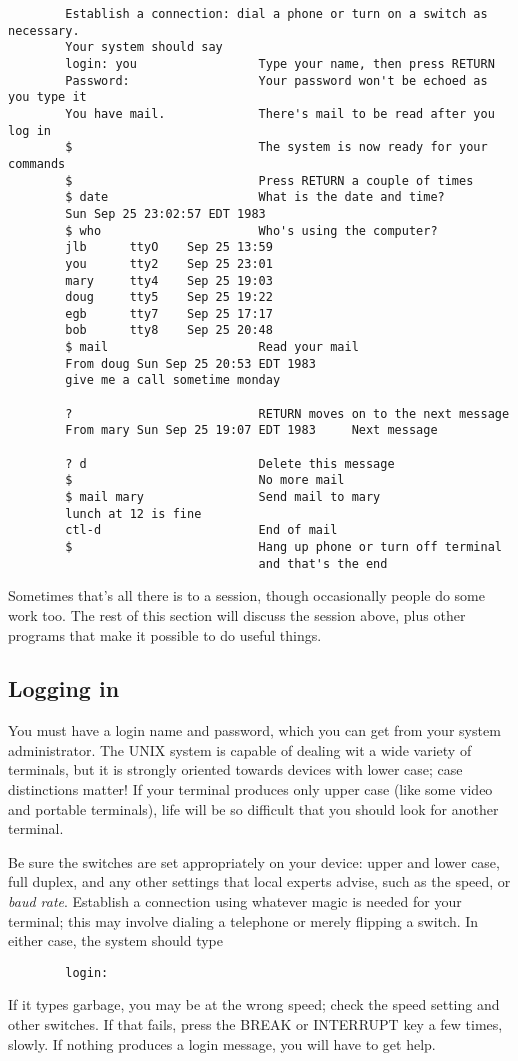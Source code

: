 \begin{verbatim}
        Establish a connection: dial a phone or turn on a switch as necessary.
        Your system should say
        login: you                 Type your name, then press RETURN
        Password:                  Your password won't be echoed as you type it
        You have mail.             There's mail to be read after you log in
        $                          The system is now ready for your commands
        $                          Press RETURN a couple of times
        $ date                     What is the date and time?
        Sun Sep 25 23:02:57 EDT 1983
        $ who                      Who's using the computer?
        jlb      ttyO    Sep 25 13:59
        you      tty2    Sep 25 23:01
        mary     tty4    Sep 25 19:03
        doug     tty5    Sep 25 19:22
        egb      tty7    Sep 25 17:17
        bob      tty8    Sep 25 20:48
        $ mail                     Read your mail
        From doug Sun Sep 25 20:53 EDT 1983
        give me a call sometime monday

        ?                          RETURN moves on to the next message
        From mary Sun Sep 25 19:07 EDT 1983     Next message

        ? d                        Delete this message
        $                          No more mail
        $ mail mary                Send mail to mary
        lunch at 12 is fine
        ctl-d                      End of mail
        $                          Hang up phone or turn off terminal
                                   and that's the end
\end{verbatim}
Sometimes that's all there is to a session, though occasionally people do some
work too. The rest of this section will discuss the session above, plus other
programs that make it possible to do useful things.


\subsection{Logging in}

You must have a login name and password, which you can get from your system
administrator. The UNIX system is capable of dealing wit a wide variety of
terminals, but it is strongly oriented towards devices with lower case; case
distinctions matter! If your terminal produces only upper case (like some video
and portable terminals), life will be so difficult that you should look for
another terminal.

Be sure the switches are set appropriately on your device: upper and lower case,
full duplex, and any other settings that local experts advise, such as the
speed, or \textit{baud rate}. Establish a connection using whatever magic is
needed for your terminal; this may involve dialing a telephone or merely
flipping a switch. In either case, the system should type
\begin{verbatim}
        login:
\end{verbatim}
If it types garbage, you may be at the wrong speed; check the speed setting and
other switches. If that fails, press the BREAK or INTERRUPT key a few times,
slowly. If nothing produces a login message, you will have to get help.

